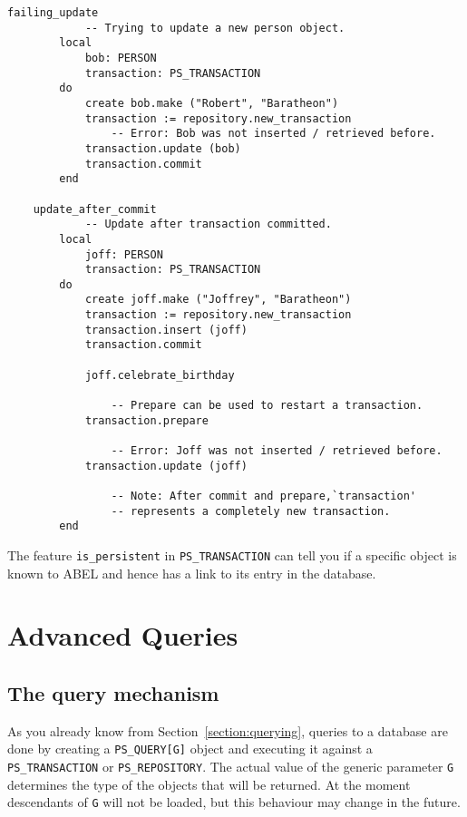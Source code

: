 \documentclass[a4paper,12pt]{report}
\begin{document}
\begin{lstlisting}[language=OOSC2Eiffel, captionpos=b, caption={Common pitfalls with update.}, label={lst:failing_update_delete}]
	failing_update
			-- Trying to update a new person object.
		local
			bob: PERSON
			transaction: PS_TRANSACTION
		do
			create bob.make ("Robert", "Baratheon")
			transaction := repository.new_transaction
				-- Error: Bob was not inserted / retrieved before.
			transaction.update (bob)
			transaction.commit
		end

	update_after_commit
			-- Update after transaction committed.
		local
			joff: PERSON
			transaction: PS_TRANSACTION
		do
			create joff.make ("Joffrey", "Baratheon")
			transaction := repository.new_transaction
			transaction.insert (joff)
			transaction.commit

			joff.celebrate_birthday

				-- Prepare can be used to restart a transaction.
			transaction.prepare

				-- Error: Joff was not inserted / retrieved before.
			transaction.update (joff)
			
				-- Note: After commit and prepare,`transaction'
				-- represents a completely new transaction.
		end
\end{lstlisting}


The feature \lstinline{is_persistent} in \lstinline!PS_TRANSACTION! can tell you if a specific object is known to ABEL and hence has a link to its entry in the database.

\chapter{Advanced Queries}
\label{sec:advanced_queries}

\section{The query mechanism}

As you already know from Section~\ref{section:querying}, queries to a database are done by creating a \lstinline!PS_QUERY[G]! object 
and executing it against a \lstinline!PS_TRANSACTION! or \lstinline!PS_REPOSITORY!.
The actual value of the generic parameter \lstinline!G! determines the type of the objects that will be returned.
At the moment descendants of \lstinline!G! will not be loaded, but this behaviour may change in the future.
\end{document}
